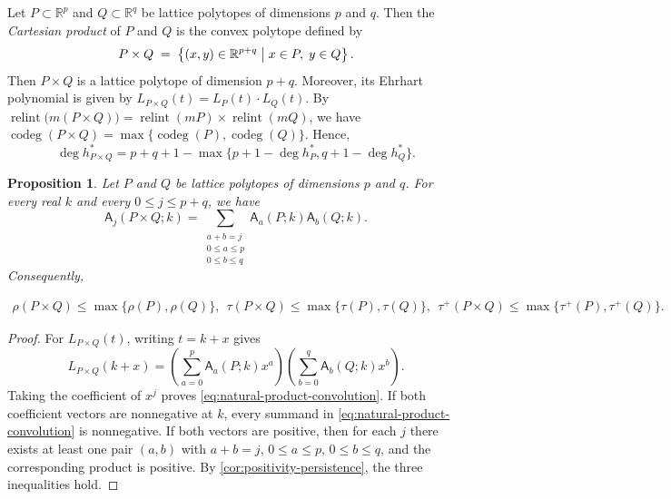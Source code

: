 \documentclass[reqno, 12pt]{article}
\numberwithin{equation}{section}
\newtheorem{proposition}[theorem]{Proposition}
\theoremstyle{definition}
\newcommand{\codeg}{\operatorname{codeg}}
\newcommand{\relint}{\operatorname{relint}}
\newcommand{\A}{\mathsf{A}}
\begin{document}
Let $P\subset \mathbb{R}^p$ and $Q\subset \mathbb{R}^q$ be lattice polytopes of dimensions $p$ and $q$. 
Then the \emph{Cartesian product} of $P$ and $Q$ is the convex polytope defined by
$$P\times Q\;=\;\left\{(x,y)\in\mathbb{R}^{p+q}\bigm| x\in P,\; y\in Q\right\}.$$
Then $P\times Q$ is a lattice polytope of dimension $p+q$.
Moreover, its Ehrhart polynomial is given by $L_{P\times Q}(t)= L_P(t)\cdot  L_Q(t)$.
By $\relint\bigl(m(P\times Q)\bigr)=\relint(mP)\times\relint(mQ)$, we have
$\codeg(P\times Q)=\max\{\codeg(P),\codeg(Q)\}$.
Hence, 
\[\deg h_{P\times Q}^* =p+q+1-\max\{p+1-\deg h_P^*,q+1-\deg h_Q^*\}.
\]

\begin{proposition}\label{prop:natural-products}
Let $P$ and $Q$ be lattice polytopes of dimensions $p$ and $q$.  For every
real $k$ and every $0\leq j\leq p+q$, we have 
\begin{equation}\label{eq:natural-product-convolution}
\A_j(P\times Q;k)=\sum_{\substack{a+b=j\\0\leq a\leq p\\0\leq b\leq q}}\A_a(P;k)\A_b(Q;k).
\end{equation}
Consequently,
\begin{small}
\begin{align*}
\rho(P\times Q)\leq\max\{\rho(P),\rho(Q)\},\ \ 
\tau(P\times Q)\leq\max\{\tau(P),\tau(Q)\},\ \ 
\tau^+(P\times Q)\leq\max\{\tau^+(P),\tau^+(Q)\}.
\end{align*}
\end{small}
\end{proposition}
\begin{proof}
For $L_{P\times Q}(t)$, writing $t=k+x$ gives
\[L_{P\times Q}(k+x)=\left(\sum_{a=0}^{p}\A_a(P;k)x^a\right)\left(\sum_{b=0}^{q}\A_b(Q;k)x^b\right).
\]
Taking the coefficient of $x^j$ proves \eqref{eq:natural-product-convolution}.
If both coefficient vectors are nonnegative at $k$, every summand in \eqref{eq:natural-product-convolution} is nonnegative.  If both vectors are positive, then for each $j$ there exists at least one pair $(a,b)$ with $a+b=j$, $0\leq a\leq p$, $0\leq b\leq q$,
and the corresponding product is positive.  By \cref{cor:positivity-persistence}, the three inequalities hold.
\end{proof}
\end{document}
